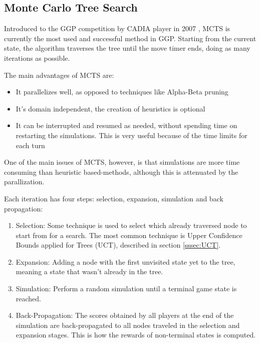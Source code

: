 \subsection{Monte Carlo Tree Search}
Introduced to the GGP competition by CADIA player in 2007 \cite{Finnsson2007}, \gls{MCTS} is currently the most used and successful method in GGP. Starting from the current state, the algorithm traverses the tree until the move timer ends, doing as many iterations as possible.


The main advantages of MCTS are:

\begin{itemize}

\item It parallelizes well, as opposed to techniques like Alpha-Beta pruning

\item It's domain independent, the creation of heuristics is optional

\item It can be interrupted and resumed as needed, without spending time on restarting the simulations. This is very useful because of the time limits for each turn

\end{itemize}

One of the main issues of \gls{MCTS}, however, is that simulations are more time consuming than heuristic based-methods, although this is attenuated by the parallization.

Each iteration has four steps: selection, expansion, simulation and back propagation:

\begin{enumerate}

\item Selection: Some technique is used to select which already traversed node to start from for a search. The most common technique is Upper Confidence Bounds applied for Trees (UCT), described in section \ref{sssec:UCT}.

\item Expansion: Adding a node with the first unvisited state yet to the tree, meaning a state that wasn’t already in the tree.

\item Simulation: Perform a random simulation until a terminal game state is reached.

\item Back-Propagation: The scores obtained by all players at the end of the simulation are back-propagated to all nodes traveled in the selection and expansion stages. This is how the rewards of non-terminal states is computed.

\end{enumerate}


